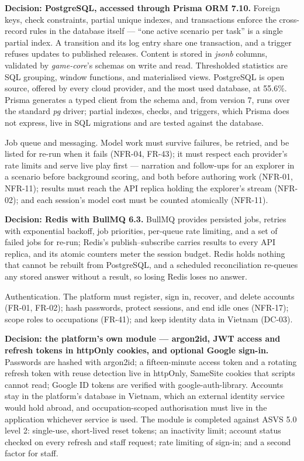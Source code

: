 \textbf{Decision: PostgreSQL, accessed through Prisma ORM 7.10.} Foreign keys, check constraints, partial unique indexes, and transactions enforce the cross-record rules in the database itself --- ``one active scenario per task'' is a single partial index\cite{r153}. A transition and its log entry share one transaction, and a trigger refuses updates to published releases. Content is stored in \textit{jsonb} columns\cite{r154}, validated by \textit{game-core}'s schemas on write and read. Thresholded statistics are SQL grouping, window functions, and materialised views. PostgreSQL is open source, offered by every cloud provider, and the most used database, at 55.6\%\cite{r136}. Prisma generates a typed client from the schema and, from version 7, runs over the standard \textit{pg} driver\cite{r155}; partial indexes, checks, and triggers, which Prisma does not express, live in SQL migrations and are tested against the database.

Job queue and messaging. Model work must survive failures, be retried, and be listed for re-run when it fails (NFR-04, FR-43); it must respect each provider's rate limits and serve live play first --- narration and follow-ups for an explorer in a scenario before background scoring, and both before authoring work (NFR-01, NFR-11); results must reach the API replica holding the explorer's stream (NFR-02); and each session's model cost must be counted atomically (NFR-11).

\textbf{Decision: Redis with BullMQ 6.3.} BullMQ provides persisted jobs, retries with exponential backoff, job priorities, per-queue rate limiting, and a set of failed jobs for re-run\cite{r156}; Redis's publish--subscribe carries results to every API replica, and its atomic counters meter the session budget. Redis holds nothing that cannot be rebuilt from PostgreSQL, and a scheduled reconciliation re-queues any stored answer without a result, so losing Redis loses no answer.

Authentication. The platform must register, sign in, recover, and delete accounts (FR-01, FR-02); hash passwords, protect sessions, and end idle ones (NFR-17); scope roles to occupations (FR-41); and keep identity data in Vietnam (DC-03).

\textbf{Decision: the platform's own module --- argon2id, JWT access and refresh tokens in httpOnly cookies, and optional Google sign-in.} Passwords are hashed with argon2id\cite{r157}; a fifteen-minute access token and a rotating refresh token with reuse detection\cite{r158} live in httpOnly, SameSite cookies that scripts cannot read; Google ID tokens are verified with google-auth-library. Accounts stay in the platform's database in Vietnam, which an external identity service would hold abroad, and occupation-scoped authorisation must live in the application whichever service is used. The module is completed against ASVS 5.0 level 2\cite{r159}: single-use, short-lived reset tokens; an inactivity limit; account status checked on every refresh and staff request; rate limiting of sign-in; and a second factor for staff.

